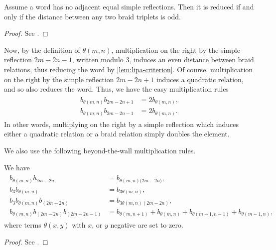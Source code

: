 \documentclass[a4paper,11pt]{amsart}
\numberwithin{equation}{subsection}
\theoremstyle{definition}
\theoremstyle{remark}
\begin{document}
\begin{Lemma}\label{lem:lipa-criterion}
Assume a word has no adjacent equal simple reflections.
Then it is reduced if and only if the distance between any two braid triplets is odd.
\end{Lemma}

\begin{proof}
See \cite[Lemma~1.1]{LiPa}.
\end{proof}

Now, by the definition of $\theta(m,n)$, multiplication on the right by the simple reflection $2m-2n-1$, written modulo 3, induces an even distance between braid relations, thus reducing the word by \autoref{lem:lipa-criterion}. Of course, multiplication on the right by the simple reflection $2m-2n+1$ induces a quadratic relation, and so also reduces the word. Thus, we have the easy multiplication rules
\begin{gather}\label{eq:theta4}
\begin{aligned}
b_{\theta(m,n)}b_{{2m-2n+1}}&=2b_{\theta(m,n)},\\
b_{\theta(m,n)}b_{{2m-2n-1}}&=2b_{\theta(m,n)}.
\end{aligned}
\end{gather}
In other words, multiplying on the right by a simple reflection which induces either a quadratic relation
or a braid relation simply doubles the element.

We also use the following beyond-the-wall multiplication rules.

\begin{Lemma}
We have
\begin{gather}\label{eq:theta5}
\begin{aligned}
b_{\theta(m,n)}b_{{2m-2n}}&=b_{\theta(m,n){(2m-2n})},\\
b_{3}b_{\theta(m,n)}&=b_{3\theta(m,n)},\\
b_{3}b_{\theta(m,n)}b_{({2m-2n})}&=b_{3\theta(m,n)(2m-2n)},\\
b_{\theta(m,n)}b_{(2m-2n)}b_{(2m-2n-1)}
&=b_{\theta(m,n+1)}+b_{\theta(m,n)}+b_{\theta(m+1,n-1)}+b_{\theta(m-1,n)},
\end{aligned}
\end{gather}
where terms $\theta(x,y)$ with $x$, or $y$ negative are set to zero.
\end{Lemma}

\begin{proof}
See \cite[Proposition~1.8]{LiPa}.
\end{proof}
\end{document}
